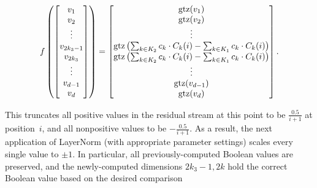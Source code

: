 \[f\left(\begin{bmatrix}
            v_1        \\
            v_2        \\
            \vdots     \\
            v_{2k_3-1} \\
            v_{2k_3}   \\
            \vdots     \\
            v_{d-1}    \\
            v_{d}      \\
        \end{bmatrix}\right) =\begin{bmatrix}
        \operatorname{gtz}(v_1)                                                                               \\
        \operatorname{gtz}(v_2)                                                                               \\
        \vdots                                                                                     \\
        \operatorname{gtz}\left(\sum_{k\in K_2} c_{k} \cdot C_k(i) -\sum_{k\in K_1} c_{k} \cdot C_k(i)\right) \\
        \operatorname{gtz}\left(\sum_{k\in K_2} c_{k} \cdot C_k(i) -\sum_{k\in K_1} c_{k} \cdot C_k(i)\right) \\
        \vdots                                                                                     \\
        \operatorname{gtz}(v_{d-1})                                                                           \\
        \operatorname{gtz}(v_{d})                                                                             \\
    \end{bmatrix}. \]

This truncates all positive values in the residual stream at this point to be $\frac{0.5}{i+1}$ at position~$i$, and all nonpositive values to be $-\frac{0.5}{i+1}$. As a result, the next application of LayerNorm (with appropriate parameter settings) scales every single value to $\pm 1$. In particular, all previously-computed Boolean values are preserved, and the newly-computed dimensions $2k_3-1,2k$ hold the correct Boolean value based on the desired comparison